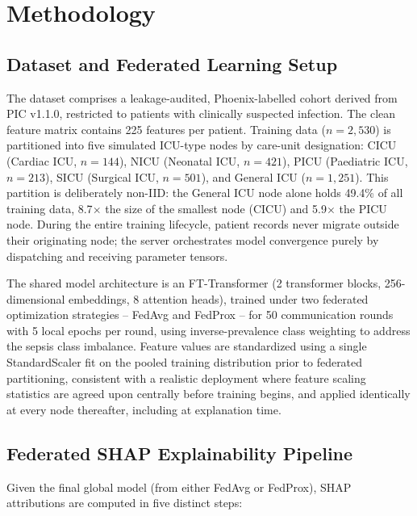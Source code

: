 \documentclass{svproc}
\begin{document}
\section{Methodology}\label{sec:method}

\subsection{Dataset and Federated Learning Setup}
The dataset comprises a leakage-audited, Phoenix-labelled cohort derived from PIC v1.1.0, restricted to patients with clinically suspected infection. The clean feature matrix contains 225 features per patient. Training data ($n = 2{,}530$) is partitioned into five simulated ICU-type nodes by care-unit designation: CICU (Cardiac ICU, $n = 144$), NICU (Neonatal ICU, $n = 421$), PICU (Paediatric ICU, $n = 213$), SICU (Surgical ICU, $n = 501$), and General ICU ($n = 1{,}251$). This partition is deliberately non-IID: the General ICU node alone holds 49.4\% of all training data, 8.7$\times$ the size of the smallest node (CICU) and 5.9$\times$ the PICU node. During the entire training lifecycle, patient records never migrate outside their originating node; the server orchestrates model convergence purely by dispatching and receiving parameter tensors.

The shared model architecture is an FT-Transformer \cite{gorishniy2021revisiting} (2 transformer blocks, 256-dimensional embeddings, 8 attention heads), trained under two federated optimization strategies -- FedAvg \cite{mcmahan2017fedavg} and FedProx \cite{li2020fedprox} -- for 50 communication rounds with 5 local epochs per round, using inverse-prevalence class weighting to address the sepsis class imbalance. Feature values are standardized using a single StandardScaler fit on the pooled training distribution prior to federated partitioning, consistent with a realistic deployment where feature scaling statistics are agreed upon centrally before training begins, and applied identically at every node thereafter, including at explanation time.

\subsection{Federated SHAP Explainability Pipeline}
Given the final global model (from either FedAvg or FedProx), SHAP attributions are computed in five distinct steps:
\end{document}
